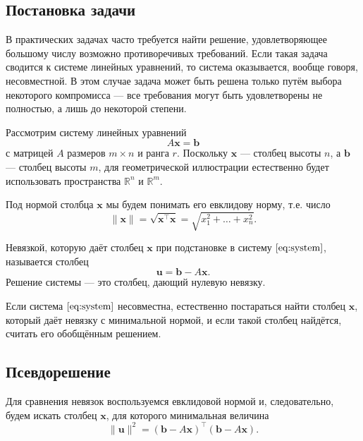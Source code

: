 \documentclass[11pt,a4paper]{article}
\begin{document}
    \hypertarget{ux43fux43eux441ux442ux430ux43dux43eux432ux43aux430-ux437ux430ux434ux430ux447ux438}{%
\subsection{Постановка
задачи}\label{ux43fux43eux441ux442ux430ux43dux43eux432ux43aux430-ux437ux430ux434ux430ux447ux438}}

В практических задачах часто требуется найти решение, удовлетворяющее
большому числу возможно противоречивых требований. Если такая задача
сводится к системе линейных уравнений, то система оказывается, вообще
говоря, несовместной. В этом случае задача может быть решена только
путём выбора некоторого компромисса --- все требования могут быть
удовлетворены не полностью, а лишь до некоторой степени.

Рассмотрим систему линейных уравнений
\[
  A\mathbf{x} = \mathbf{b} \tag{1}\label{eq:system}
\]
с матрицей \(A\) размеров \(m \times n\) и ранга \(r\). Поскольку
\(\mathbf{x}\) --- столбец высоты \(n\), а \(\mathbf{b}\) --- столбец
высоты \(m\), для геометрической иллюстрации естественно будет
использовать пространства \(\mathbb{R}^n\) и \(\mathbb{R}^m\).

Под нормой столбца \(\mathbf{x}\) мы будем понимать его евклидову норму,
т.е. число \[
  \|\mathbf{x}\| = \sqrt{\mathbf{x^\top x}} = \sqrt{x_1^2 + \ldots + x_n^2}.
\]

Невязкой, которую даёт столбец \(\mathbf{x}\) при подстановке в систему
\(\eqref{eq:system}\), называется столбец \[
  \mathbf{u} = \mathbf{b} - A\mathbf{x}.
\] Решение системы --- это столбец, дающий нулевую невязку.

Если система \(\eqref{eq:system}\) несовместна, естественно постараться
найти столбец \(\mathbf{x}\), который даёт невязку с минимальной нормой,
и если такой столбец найдётся, считать его обобщённым решением.

    \hypertarget{ux43fux441ux435ux432ux434ux43eux440ux435ux448ux435ux43dux438ux435}{%
\subsection{Псевдорешение}\label{ux43fux441ux435ux432ux434ux43eux440ux435ux448ux435ux43dux438ux435}}

Для сравнения невязок воспользуемся евклидовой нормой и, следовательно,
будем искать столбец \(\mathbf{x}\), для которого минимальная величина
\[
  \|\mathbf{u}\|^2 = (\mathbf{b} - A\mathbf{x})^\top (\mathbf{b} - A \mathbf{x}).
\]
\end{document}
